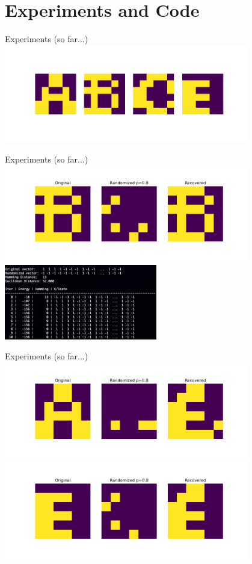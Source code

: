 \documentclass[10pt]{beamer}
\begin{document}
\section{Experiments and Code}

\begin{frame}{Experiments (so far...)}	
	\centering
	\includegraphics[width=0.8\textwidth]{"../img/small_letters.png"}
\end{frame}

\begin{frame}{Experiments (so far...)}	
	\centering
	\includegraphics[width=0.8\textwidth]{"../img/letters_result_B.png"}	
	\includegraphics[width=0.5\textwidth]{"../img/log_letter_B.png"}

\end{frame}

\begin{frame}{Experiments (so far...)}	
	\centering
	\includegraphics[width=0.8\textwidth]{"../img/letters_result_A.png"}
	\includegraphics[width=0.8\textwidth]{"../img/letters_result_E.png"}	
\end{frame}
\end{document}
